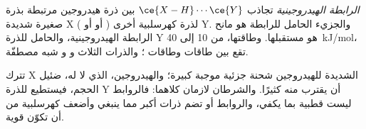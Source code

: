 \begin{definition}\label{def:b1:intermolecular-forces-solvents:hbond}
\emph{الرابطة الهيدروجينية} تجاذب
$\ce{X-H}\cdots\ce{Y}$ بين ذرة هيدروجين مرتبطة بذرة صغيرة شديدة
 X ( أو  أو ) 
لذرة كهرسلبية أخرى Y. والجزيء الحامل للرابطة  هو
مانح الرابطة الهيدروجينية، والحامل للذرة Y هو مستقبلها. وطاقتها، من 10
إلى \qty{40}{kJ/mol}، تقع بين طاقات  وطاقات ؛ والذرات الثلاث  و و شبه مصطفّة.
\end{definition}

\begin{remark}[لماذا N وO وF]\label{rem:b1:intermolecular-forces-solvents:why}
تترك X الشديدة  للهيدروجين شحنة جزئية موجبة
كبيرة؛ والهيدروجين، الذي لا  له، ضئيل الحجم، فيستطيع
 للذرة Y أن يقترب منه كثيرًا. والشرطان لازمان كلاهما:
فالروابط  ليست قطبية بما يكفي، والروابط  أو 
تضم ذرات أكبر مما ينبغي وأضعف كهرسلبية من أن تكوّن 
قوية.
\end{remark}

